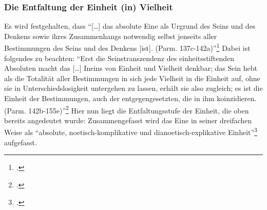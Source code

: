 \subsubsection{Die Entfaltung der Einheit (in) Vielheit}
Es wird festgehalten, dass \enquote{[\dots] das absolute Eine als Urgrund des Seins und des Denkens sowie ihres Zusammenhangs notwendig selbst jenseits aller Bestimmungen des Seins und des Denkens [ist]. (Parm. 137c-142a)}\footcite[vgl.][S. 188f.]{halfwassenaufstieg2006} Dabei ist folgendes zu beachten:
\enquote{Erst die Seinstranszendenz des einheitsstiftenden Absoluten macht das [\dots] Ineins von Einheit und Vielheit denkbar; das Sein hebt als die Totalität aller Bestimmungen in sich jede Vielheit in die Einheit auf, ohne sie in Unterschiedslosigkeit untergehen zu lassen, erhält sie also zugleich; es ist die Einheit der Bestimmungen, auch der entgegengesetzten, die in ihm koinzidieren.(Parm. 142b-155e)}\footcite[vgl.][S. 189]{halfwassenaufstieg2006}
Hier nun liegt die Entfaltungsstufe der Einheit, die oben bereits angedeutet wurde:
Zusammengefasst wird das Eine in seiner dreifachen Weise als \enquote{absolute, noetisch-komplikative und dianoetisch-explikative Einheit}\footcite[][S. 190]{halfwassenaufstieg2006} aufgefasst.
